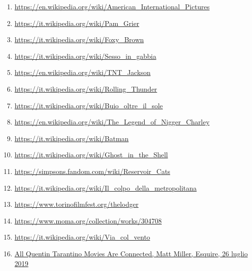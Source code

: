 \documentclass[12pt]{article} %
\begin{document}
\begin{flushleft}
\begin{enumerate}
        \item \href{https://en.wikipedia.org/wiki/American_International_Pictures}{https://en.wikipedia.org/wiki/American\_International\_Pictures}
        \item \href{https://it.wikipedia.org/wiki/Pam_Grier}{https://it.wikipedia.org/wiki/Pam\_Grier}
        \item \href{https://it.wikipedia.org/wiki/Foxy_Brown_(film)}{https://it.wikipedia.org/wiki/Foxy\_Brown}
        \item \href{https://it.wikipedia.org/wiki/Sesso_in_gabbia}{https://it.wikipedia.org/wiki/Sesso\_in\_gabbia}
        \item \href{https://en.wikipedia.org/wiki/TNT_Jackson}{https://en.wikipedia.org/wiki/TNT\_Jackson}
        \item \href{https://it.wikipedia.org/wiki/Rolling_Thunder_(film_1977)}{https://it.wikipedia.org/wiki/Rolling\_Thunder}
        \item \href{https://it.wikipedia.org/wiki/Buio_oltre_il_sole}{https://it.wikipedia.org/wiki/Buio\_oltre\_il\_sole}
        \item \href{https://en.wikipedia.org/wiki/The_Legend_of_Nigger_Charley}{https://en.wikipedia.org/wiki/The\_Legend\_of\_Nigger\_Charley}
        \item \href{https://it.wikipedia.org/wiki/Batman_(film_1966)}{https://it.wikipedia.org/wiki/Batman}
        \item \href{https://it.wikipedia.org/wiki/Ghost_in_the_Shell_(film_1995)}{https://it.wikipedia.org/wiki/Ghost\_in\_the\_Shell}
        \item \href{https://simpsons.fandom.com/wiki/Reservoir_Cats}{https://simpsons.fandom.com/wiki/Reservoir\_Cats}
        \item \href{https://it.wikipedia.org/wiki/Il_colpo_della_metropolitana_(Un_ostaggio_al_minuto)}{https://it.wikipedia.org/wiki/Il\_colpo\_della\_metropolitana}
        \item \href{https://www.torinofilmfest.org/it/11-festival-internazionale-cinema-giovani/film/the-lodger-/-a-story-of-the-london-fog/2473/}{https://www.torinofilmfest.org/thelodger}
        \item \href{https://www.moma.org/collection/works/304708}{https://www.moma.org/collection/works/304708}
        \item \href{https://it.wikipedia.org/wiki/Via_col_vento}{https://it.wikipedia.org/wiki/Via\_col\_vento}
        \item \href{https://www.esquire.com/entertainment/movies/news/a41379/quentin-tarantino-movies-connected/}{All Quentin Tarantino Movies Are Connected, Matt Miller, Esquire, 26 luglio 2019}

\end{enumerate}
\end{flushleft}
\end{document}
